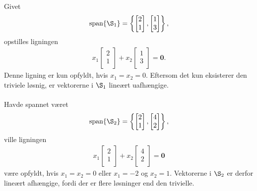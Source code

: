 \begin{eks}\label{fisk}
Givet
\begin{align*}
\text{span}\{\S_1 \} =
\left\{ 
\begin{bmatrix}
           2 \\
           1 \\
\end{bmatrix} 
,
\begin{bmatrix}
           1 \\
           3 \\
\end{bmatrix}
\right\},
\end{align*}
opstilles ligningen  
%
\begin{align*}
x_1 
\begin{bmatrix}
           2 \\
           1 \\
\end{bmatrix} 
+ x_2
\begin{bmatrix}
           1 \\
           3 \\
\end{bmatrix}
= \mathbf{0}.
\end{align*}
%
Denne ligning er kun opfyldt, hvis $x_1=x_2=0$. 
Eftersom det kun eksisterer den triviele løsnig, er vektorerne i $\S_1$ lineært uafhængige.
\\\\
Havde spannet været 
\begin{align*}
\text{span}\{\S_2 \} =
\left\{ 
\begin{bmatrix}
           2 \\
           1 \\
\end{bmatrix} 
,
\begin{bmatrix}
           4 \\
           2 \\
\end{bmatrix}
\right\},
\end{align*}
%
ville ligningen 
%
\begin{align*}
x_1 
\begin{bmatrix}
           2 \\
           1 \\
\end{bmatrix} 
+ x_2
\begin{bmatrix}
           4 \\
           2 \\
\end{bmatrix}
= \mathbf{0}
\end{align*}
%
være opfyldt, hvis $x_1=x_2=0$ eller $x_1=-2$ og $x_2=1$. 
Vektorerne i $\S_2$ er derfor lineært afhængige, fordi der er flere løsninger end den trivielle.
%
\end{eks}
